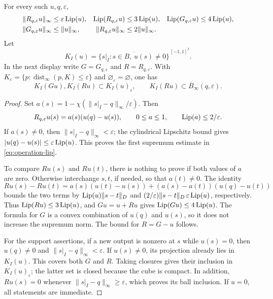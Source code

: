 \begin{lemma}\label{lem:operations}
For every such \(u,q,\varepsilon\),
\begin{align}
 \|R_{q,\varepsilon}u\|_\infty
   &\leq\varepsilon\operatorname{Lip}(u),&
 \operatorname{Lip}(R_{q,\varepsilon}u)&\leq3\operatorname{Lip}(u),&
 \operatorname{Lip}(G_{q,\varepsilon}u)&\leq4\operatorname{Lip}(u), \label{eq:operation-lip}\\
 \|G_{q,\varepsilon}u\|_\infty
   &\leq\|u\|_\infty,&
 \|R_{q,\varepsilon}u\|_\infty&\leq2\|u\|_\infty. \label{eq:operation-sup}
\end{align}
Let
\[
 K_I(u)=\overline{\{s|_I:s\in B,\ u(s)\ne0\}}^{\,[-1,1]^I}.
\]
In the next display write \(G=G_{q,\varepsilon}\) and
\(R=R_{q,\varepsilon}\).
With \(K_\varepsilon=\{p:\operatorname{dist}_\infty(p,K)\leq
\varepsilon\}\) and \(\varnothing_\varepsilon=\varnothing\), one has
\begin{equation}
 K_I(Gu),K_I(Ru)\subset K_I(u)_\varepsilon,\qquad
 K_I(Ru)\subset\overline B_\infty(q,\varepsilon).             \label{eq:operation-support}
\end{equation}
\end{lemma}

\begin{proof}
Set \(a(s)=1-\chi(\|s|_I-q\|_\infty/\varepsilon)\). Then
\[
 R_{q,\varepsilon}u(s)=a(s)(u(q)-u(s)),\qquad
 0\leq a\leq1,\qquad \operatorname{Lip}(a)\leq2/\varepsilon.
\]
If \(a(s)\ne0\), then \(\|s|_I-q\|_\infty<\varepsilon\);
the cylindrical Lipschitz bound gives
\(|u(q)-u(s)|\leq\varepsilon\operatorname{Lip}(u)\). This proves the first
supremum estimate in \eqref{eq:operation-lip}.

To compare \(Ru(s)\) and \(Ru(t)\), there is nothing to prove if both
values of \(a\) are zero. Otherwise interchange \(s,t\), if needed,
so that \(a(t)\ne0\). The identity
\[
 Ru(s)-Ru(t)
 =a(s)(u(t)-u(s))+(a(s)-a(t))(u(q)-u(t))
\]
bounds the two terms by \(\operatorname{Lip}(u)\|s-t\|_D\) and
\((2/\varepsilon)\|s-t\|_D\,\varepsilon\operatorname{Lip}(u)\), respectively.
Thus \(\operatorname{Lip}(Ru)\leq3\operatorname{Lip}(u)\), and \(Gu=u+Ru\) gives
\(\operatorname{Lip}(Gu)\leq4\operatorname{Lip}(u)\). The formula for \(G\) is a convex
combination of \(u(q)\) and \(u(s)\), so it does not increase the
supremum norm. The bound for \(R=G-u\) follows.

For the support assertions, if a new output is nonzero at \(s\) while
\(u(s)=0\), then \(u(q)\ne0\) and
\(\|s|_I-q\|_\infty<\varepsilon\). If \(u(s)\ne0\), its projection
already lies in \(K_I(u)\). This covers both \(G\) and \(R\).
Taking closures gives their inclusion in \(K_I(u)_\varepsilon\);
the latter set is closed because the cube is compact. In addition,
\(Ru(s)=0\) whenever \(\|s|_I-q\|_\infty\geq\varepsilon\),
which proves its ball inclusion. If \(u=0\), all statements are
immediate.
\end{proof}

